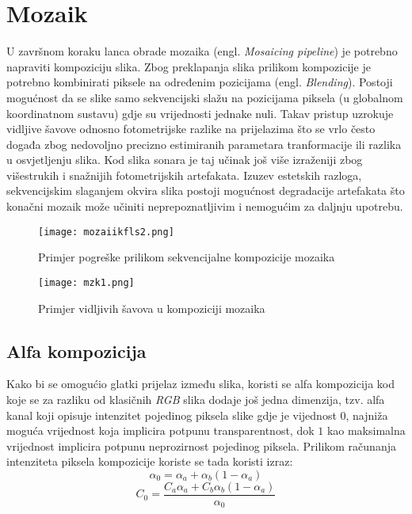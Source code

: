 \documentclass[times, utf8, diplomski]{fer}
\begin{document}
\chapter{Mozaik}
U završnom koraku lanca obrade mozaika (engl. \textit{Mosaicing pipeline}) je potrebno napraviti kompoziciju slika. Zbog preklapanja slika prilikom kompozicije je potrebno kombinirati piksele na određenim pozicijama (engl. \textit{Blending}). Postoji mogućnost da se slike samo sekvencijski slažu na pozicijama piksela (u globalnom koordinatnom sustavu) gdje su vrijednosti jednake nuli. Takav pristup uzrokuje vidljive šavove odnosno fotometrijske razlike na prijelazima što se vrlo često događa zbog nedovoljno precizno estimiranih parametara tranformacije ili razlika u osvjetljenju slika. Kod slika sonara je taj učinak još više izraženiji zbog višestrukih i snažnijih fotometrijskih artefakata. Izuzev estetskih razloga, sekvencijskim slaganjem okvira slika postoji mogućnost degradacije artefakata što konačni mozaik može učiniti neprepoznatljivim i nemogućim za daljnju upotrebu.
\begin{figure}[!tbh]
\centering
\texttt{[image: mozaiikfls2.png]}
		\caption{ Primjer pogreške prilikom sekvencijalne kompozicije mozaika}
		\label{fig:Primjer pogreške prilikom sekvencijalen kompozicije mozaika}
\end{figure}


\begin{figure}[!tbh]
\centering
\texttt{[image: mzk1.png]}
		\caption{ Primjer vidljivih šavova u kompoziciji mozaika}
		\label{fig:Primjer vidljivih šavova u kompoziciji mozaika}
\end{figure}
\section{Alfa kompozicija}
Kako bi se omogućio glatki prijelaz između slika, koristi se alfa kompozicija kod koje se za razliku od klasičnih \textit{RGB} slika dodaje još jedna dimenzija, tzv. alfa kanal koji opisuje intenzitet pojedinog piksela slike gdje je vijednost $0$, najniža moguća vrijednost koja implicira potpunu transparentnost, dok $1$ kao maksimalna vrijednost implicira potpunu neprozirnost pojedinog piksela. Prilikom računanja intenziteta piksela kompozicije koriste se tada koristi izraz:
$$ \alpha_0 = \alpha_a + \alpha_b(1-\alpha_a)$$
$$ C_0 = \frac{C_a \alpha_a + C_b \alpha_b(1-\alpha_a)}{\alpha_0} $$
\end{document}
